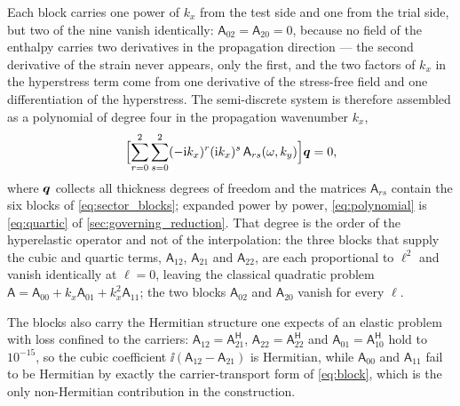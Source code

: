 Each block carries one power of $k_x$ from the test side and one from the trial
side, but two of the nine vanish identically: $\mathsf A_{02}=\mathsf A_{20}=0$,
because no field of the enthalpy carries two derivatives in the propagation
direction --- the second derivative of the strain never appears, only the first,
and the two factors of $k_x$ in the hyperstress term come from one derivative of
the stress-free field and one differentiation of the hyperstress.  The
semi-discrete system is therefore assembled as a polynomial of degree four in the
propagation wavenumber $k_x$,
\begin{equation}
\label{eq:polynomial}
\Bigl[\sum_{r=0}^{2}\sum_{s=0}^{2}(-\mathrm{i} k_x)^{r}(\mathrm{i} k_x)^{s}\,
\mathsf{A}_{rs}(\omega,k_y)\Bigr]\boldsymbol{q}=0 ,
\end{equation}
where $\boldsymbol{q}$ collects all thickness degrees of freedom and the matrices
$\mathsf{A}_{rs}$ contain the six blocks of \eqref{eq:sector_blocks}; expanded
power by power, \eqref{eq:polynomial} is \eqref{eq:quartic} of
\cref{sec:governing_reduction}.  That degree is the order of the hyperelastic
operator and not of the interpolation: the three blocks that supply the cubic and
quartic terms, $\mathsf A_{12}$, $\mathsf A_{21}$ and $\mathsf A_{22}$, are
each proportional to $\ell^{2}$ and vanish identically at $\ell=0$, leaving the
classical quadratic problem
$\mathsf A=\mathsf A_{00}+k_x\mathsf A_{01}+k_x^{2}\mathsf A_{11}$; the two
blocks $\mathsf A_{02}$ and $\mathsf A_{20}$ vanish for every $\ell$.

The blocks also carry the Hermitian structure one expects of an elastic problem
with loss confined to the carriers: $\mathsf A_{12}=\mathsf A_{21}^{\mathsf H}$,
$\mathsf A_{22}=\mathsf A_{22}^{\mathsf H}$ and
$\mathsf A_{01}=\mathsf A_{10}^{\mathsf H}$ hold to $10^{-15}$, so the cubic
coefficient $\ii(\mathsf A_{12}-\mathsf A_{21})$ is Hermitian, while
$\mathsf A_{00}$ and $\mathsf A_{11}$ fail to be Hermitian by exactly the
carrier-transport form of \eqref{eq:block}, which is the only non-Hermitian
contribution in the construction.

